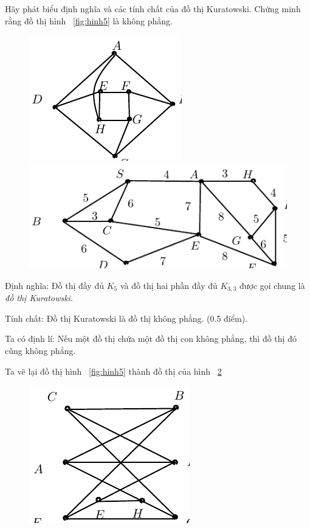 \documentclass[11pt]{article}
\begin{document}
\begin{shortanswer}[title={\relax}, rearrange=no]
\begin{question}%
Hãy phát biểu định nghĩa và các tính chất của đồ thị Kuratowski. Chứng minh rằng đồ thị  hình ~\ref{fig:hinh5} là không phẳng.
\begin{figure}[!ht]
\begin{minipage}[b]{5cm}
\centering
\includegraphics[scale =1]{dothiphang1}
\caption{}\label{fig:hinh5}
\end{minipage}
\hfill
\begin{minipage}[b]{9cm}
\centering
\includegraphics[scale =1]{thuattoan1}
\caption{}\label{fig:hinh7}
\end{minipage}
\end{figure}
\begin{answer}
Định nghĩa: Đồ thị đầy đủ $K_5$ và đồ thị hai phần đầy đủ $K_{3,3}$ được gọi chung là {\it đồ thị Kuratowski}.

Tính chất: Đồ thị Kuratowski là đồ thị không phẳng. (0.5 điểm).

Ta có định lí: Nếu một đồ thị chứa một đồ thị con không phẳng, thì đồ thị đó cũng không phẳng. 

Ta vẽ lại đồ thị hình ~\ref{fig:hinh5} thành đồ thị của hình ~\ref{fig:hinh6}

\begin{figure}[!ht]
\centering
\includegraphics[scale =1]{dothiphang2}
\caption{}\label{fig:hinh6}
\end{figure}


\end{answer}
\end{question}
\end{shortanswer}
\end{document}
